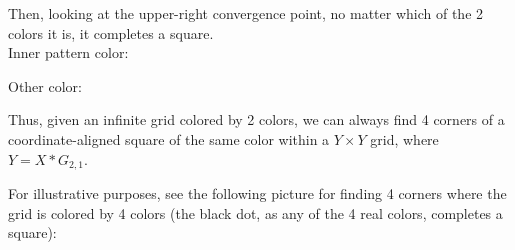 \documentclass[11pt]{article}
\newcommand*{\scalePic}{0.4}
\newcommand*{\gridArg}[7]{%
    \foreach \x in {\fpeval{#1},\fpeval{#1+#2},...,\fpeval{#3+0.0001}} %
        \draw [black, thin, #7] (\x,\fpeval{#4}) -- (\x,\fpeval{#6+0.0001});
    \foreach \y in {\fpeval{#4},\fpeval{#4+#5},...,\fpeval{#6+0.0001}}
        \draw [black, thin, #7] (\fpeval{#1},\y) -- (\fpeval{#3+0.0001},\y);
}
\newcommand*{\grid}[6]{\gridArg{#1}{#2}{#3}{#4}{#5}{#6}{}}%
\newcommand*{\mybigbox}[4]{\grid{#1}{#3}{#1+#3}{#2}{#4}{#2+#4}} %
\newcommand*{\point}[3]{\node at (#1 + 0.5, #2 + 0.5)[circle, fill, inner sep=\scalePic*5pt, #3]{}; \gridArg{#1}{1}{#1+1}{#2}{1}{#2+1}{draw=none}}
\newcommand*{\red}{red!80!blue}
\newcommand*{\blue}{blue!60!green}
\newcommand{\echoWithinShell}[1]{ ( echo \\\\\\\\begin\\{lstlisting\\}\\[breaklines\\] && echo #1 && echo \\\\\\\\end\\{lstlisting\\} ) }
\newcommand{\shellRun}[2] {%
   && \echoWithinShell{\\ #1} && \echoWithinShell{\\ $OUTPUT} ) }%
}
\newcommand{\cppRun}[2]{%
  \shellRun{#1 #2}{run}
}
\begin{document}
Then, looking at the upper-right convergence point, no matter which of the 2 colors it is, it completes a square.\\

Inner pattern color:
\begin{center}
\end{center}

\pagebreak
Other color:
\begin{center}
\end{center}

Thus, given an infinite grid colored by 2 colors, we can always find 4 corners of a coordinate-aligned square of the same color within a $Y \times Y$ grid, where $Y = X * G_{2,1}$.

For illustrative purposes, see the following picture for finding 4 corners where the grid is colored by 4 colors (the black dot, as any of the 4 real colors, completes a square):
\begin{center}
\end{center}
\end{document}
